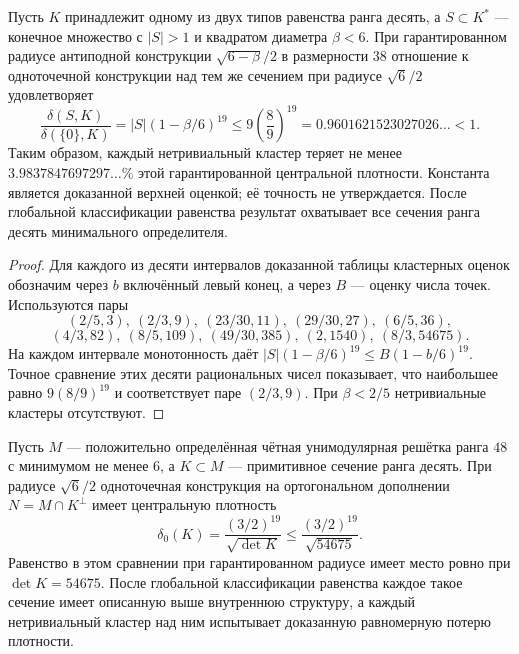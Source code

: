 \begin{corollary}
\label{cor:uniform-rank-ten-cluster-loss}
Пусть $K$ принадлежит одному из двух типов равенства ранга десять,
а $S\subset K^*$ --- конечное множество с $|S|>1$ и квадратом
диаметра $\beta<6$. При гарантированном радиусе антиподной конструкции
$\sqrt{6-\beta}/2$ в размерности $38$ отношение к одноточечной
конструкции над тем же сечением при радиусе $\sqrt6/2$ удовлетворяет
\[
 \frac{\delta(S,K)}{\delta(\{0\},K)}
 =|S|(1-\beta/6)^{19}
 \le 9\left(\frac89\right)^{19}
 =0.9601621523027026\ldots<1.
\]
Таким образом, каждый нетривиальный кластер теряет не менее
$3.9837847697297\ldots\%$ этой гарантированной центральной плотности.
Константа является доказанной верхней оценкой; её точность не утверждается.
После глобальной классификации равенства результат охватывает все
сечения ранга десять минимального определителя.
\end{corollary}

\begin{proof}
Для каждого из десяти интервалов доказанной таблицы кластерных оценок
обозначим через $b$ включённый левый конец, а через $B$ --- оценку
числа точек. Используются пары
\[
 (2/5,3),\ (2/3,9),\ (23/30,11),\ (29/30,27),\ (6/5,36),
\]
\[
 (4/3,82),\ (8/5,109),\ (49/30,385),\ (2,1540),\ (8/3,54675).
\]
На каждом интервале монотонность даёт
$|S|(1-\beta/6)^{19}\le B(1-b/6)^{19}$.
Точное сравнение этих десяти рациональных чисел показывает, что
наибольшее равно $9(8/9)^{19}$ и соответствует паре $(2/3,9)$.
При $\beta<2/5$ нетривиальные кластеры отсутствуют.
\end{proof}

\begin{corollary}
\label{cor:rank-ten-density-scope}
Пусть $M$ --- положительно определённая чётная унимодулярная решётка
ранга $48$ с минимумом не менее $6$, а $K\subset M$ --- примитивное
сечение ранга десять. При радиусе $\sqrt6/2$ одноточечная конструкция
на ортогональном дополнении $N=M\cap K^\perp$ имеет центральную плотность
\[
 \delta_0(K)=\frac{(3/2)^{19}}{\sqrt{\det K}}
 \le\frac{(3/2)^{19}}{\sqrt{54675}}.
\]
Равенство в этом сравнении при гарантированном радиусе имеет место
ровно при $\det K=54675$. После глобальной классификации равенства
каждое такое сечение имеет описанную выше внутреннюю структуру,
а каждый нетривиальный кластер над ним испытывает доказанную
равномерную потерю плотности.
\end{corollary}

